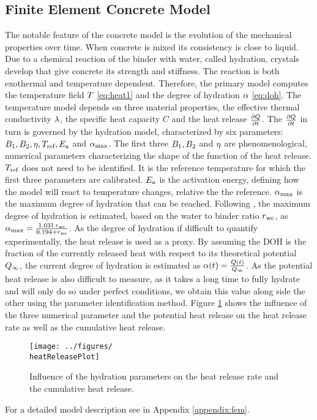 \subsection{Finite Element Concrete Model}
The notable feature of the concrete model is the evolution of the mechanical properties over time.
When concrete is mixed its consistency is close to liquid.
Due to a chemical reaction of the binder with water, called hydration, crystals develop that give concrete its strength and stiffness.
The reaction is both exothermal and temperature dependent.
Therefore, the primary model computes the temperature field $T$ \eqref{eq:heat1} and the degree of hydration $\alpha$ \eqref{eq:doh}.
The temperature model depends on three material properties, the effective thermal conductivity $\lambda$, the specific heat capacity $C$ and the heat release $\frac{\partial Q}{\partial t}$.
The $\frac{\partial Q}{\partial t}$ in turn is governed by the hydration model, characterized by six parameters:
$B_1, B_2, \eta, T_{\text{ref}}, E_{\text{a}}$ and $\alpha_{\text{max}}$.
The first three $B_1, B_2$ and $\eta$ are phenomenological, numerical parameters characterizing the shape of the function of the heat release.
$T_{\text{ref}}$ does not need to be identified.
It is the reference temperature for which the first three parameters are calibrated.
$E_{\text{a}}$ is the activation energy, defining how the model will react to temperature changes, relative the the reference. 
$\alpha_{\text{max}}$ is the maximum degree of hydration that can be reached.
Following \cite{Mills1966fico}, the maximum degree of hydration is estimated, based on the water to binder ratio $r_{\text{wc}}$, as $\alpha_{\text{max}} = \frac{1.031\,r_{\text{wc}}}{0.194 + r_{\text{wc}}}$.
As the degree of hydration if difficult to quantify experimentally, the heat release is used as a proxy.
By assuming the DOH is the fraction of the currently released heat with respect to its theoretical potential $Q_{\infty}$, the current degree of hydration is estimated as $\alpha(t) = \frac{Q(t)}{Q_{\infty}}$.
As the potential heat release is also difficult to measure, as it takes a long time to fully hydrate and will only do so under perfect conditions, we obtain this value along side the other using the parameter identification method.
Figure \ref{fig:heatrelease} shows the influence of the three numerical parameter and the potential heat release on the heat release rate as well as the cumulative heat release.
\begin{figure}[h]%
	\centering
	\texttt{[image: ../figures/\\heatReleasePlot]}
	\caption{Influence of the hydration parameters on the heat release rate and the cumulative heat release.}\label{fig:heatrelease}
\end{figure}
For a detailed model description see in Appendix \ref{appendix:fem}.

